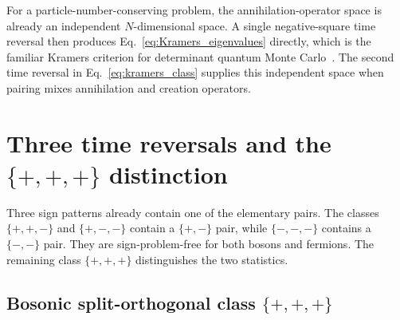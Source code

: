 \documentclass[onecolumn,aps,prb,amsmath,amssymb,superscriptaddress,longbibliography]{revtex4-2}
\begin{document}
For a particle-number-conserving problem, the annihilation-operator space is already an independent \(N\)-dimensional space.  A single negative-square time reversal then produces Eq.~\eqref{eq:Kramers_eigenvalues} directly, which is the familiar Kramers criterion for determinant quantum Monte Carlo~\cite{wu2005prb}.  The second time reversal in Eq.~\eqref{eq:kramers_class} supplies this independent space when pairing mixes annihilation and creation operators.

\section{Three time reversals and the \texorpdfstring{\(\{+,+,+\}\)}{\{+,+,+\}} distinction}

Three sign patterns already contain one of the elementary pairs.  The classes \(\{+,+,-\}\) and \(\{+,-,-\}\) contain a \(\{+,-\}\) pair, while \(\{-,-,-\}\) contains a \(\{-,-\}\) pair.  They are sign-problem-free for both bosons and fermions.  The remaining class \(\{+,+,+\}\) distinguishes the two statistics.

\subsection{Bosonic split-orthogonal class \texorpdfstring{\(\{+,+,+\}\)}{\{+,+,+\}}}
\end{document}
